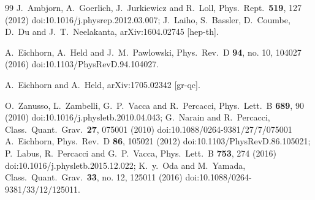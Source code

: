 \documentclass[%
 reprint,
 superscriptaddress,
preprintnumbers,
nofootinbib,
 amsmath,amssymb,
 aps,
prl,
]{revtex4-1}
\begin{document}
\begin{thebibliography}{99}
  J.~Ambjorn, A.~Goerlich, J.~Jurkiewicz and R.~Loll,
  Phys.\ Rept.\  {\bf 519}, 127 (2012)
  doi:10.1016/j.physrep.2012.03.007;
  J.~Laiho, S.~Bassler, D.~Coumbe, D.~Du and J.~T.~Neelakanta,
  arXiv:1604.02745 [hep-th].
  
  A.~Eichhorn, A.~Held and J.~M.~Pawlowski,
  Phys.\ Rev.\ D {\bf 94}, no. 10, 104027 (2016)
  doi:10.1103/PhysRevD.94.104027.
  
  A.~Eichhorn and A.~Held,
  arXiv:1705.02342 [gr-qc].
  
  O.~Zanusso, L.~Zambelli, G.~P.~Vacca and R.~Percacci,
  Phys.\ Lett.\ B {\bf 689}, 90 (2010)
  doi:10.1016/j.physletb.2010.04.043;
    G.~Narain and R.~Percacci,
  Class.\ Quant.\ Grav.\  {\bf 27}, 075001 (2010)
  doi:10.1088/0264-9381/27/7/075001
    A.~Eichhorn,
  Phys.\ Rev.\ D {\bf 86}, 105021 (2012)
  doi:10.1103/PhysRevD.86.105021;
  P.~Labus, R.~Percacci and G.~P.~Vacca,
  Phys.\ Lett.\ B {\bf 753}, 274 (2016)
 doi:10.1016/j.physletb.2015.12.022;
  K.~y.~Oda and M.~Yamada,
  Class.\ Quant.\ Grav.\  {\bf 33}, no. 12, 125011 (2016)
  doi:10.1088/0264-9381/33/12/125011.
  

\end{thebibliography}
\end{document}
